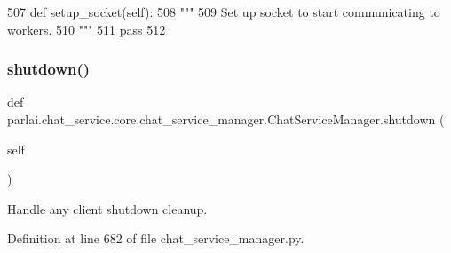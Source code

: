 \begin{DoxyCode}
507     \textcolor{keyword}{def }setup\_socket(self):
508         \textcolor{stringliteral}{"""}
509 \textcolor{stringliteral}{        Set up socket to start communicating to workers.}
510 \textcolor{stringliteral}{        """}
511         \textcolor{keywordflow}{pass}
512 
\end{DoxyCode}
\mbox{\label{classparlai_1_1chat__service_1_1core_1_1chat__service__manager_1_1ChatServiceManager_af2ba119314976bd2ae1524967fe9b1f1}} 
\subsubsection{\texorpdfstring{shutdown()}{shutdown()}}
{\footnotesize\ttfamily def parlai.\+chat\+\_\+service.\+core.\+chat\+\_\+service\+\_\+manager.\+Chat\+Service\+Manager.\+shutdown (\begin{DoxyParamCaption}\item[{}]{self }\end{DoxyParamCaption})}

\begin{DoxyVerb}Handle any client shutdown cleanup.
\end{DoxyVerb}
 

Definition at line 682 of file chat\+\_\+service\+\_\+manager.\+py.


